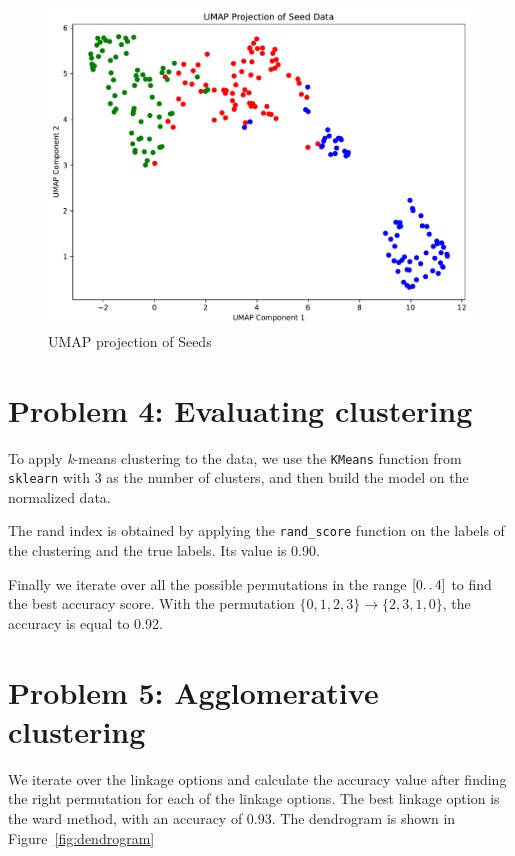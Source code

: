 \documentclass[a4paper]{article}
\begin{document}
\begin{figure}[H]
  \begin{center}
    \includegraphics[width=\textwidth]{ola/umap.pdf}
    \caption{UMAP projection of Seeds}
    \label{fig:umap}
  \end{center}
\end{figure}

\section*{Problem 4: Evaluating clustering}
To apply \textit{k}-means clustering to the data, we use the \verb|KMeans| function from \verb|sklearn| with 3 as the number of clusters, and then build the model on the normalized data.

The rand index is obtained by applying the \verb|rand_score| function on the labels of the clustering and the true labels. Its value is 0.90.

Finally we iterate over all the possible permutations in the range $ [0\ldotp\ldotp4] $ to find the best accuracy score. With the permutation $\{0, 1, 2, 3\} \rightarrow \{2, 3, 1, 0\}$, the accuracy is equal to 0.92.

\section*{Problem 5: Agglomerative clustering}
We iterate over the linkage options and calculate the accuracy value after finding the right permutation for each of the linkage options. The best linkage option is the ward method, with an accuracy of 0.93.
The dendrogram is shown in Figure~\ref{fig:dendrogram}
\end{document}
